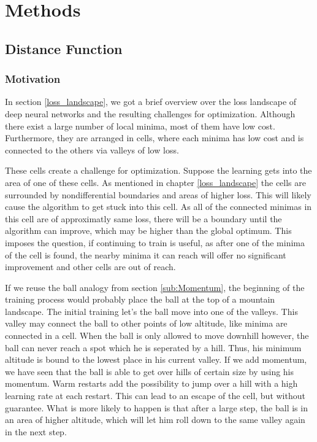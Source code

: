 \chapter{Methods}\label{cha:Methods}
\section{Distance Function}
\subsection{Motivation}\label{sub:Motivation}
In section \ref{loss_landscape}, we got a brief overview over the loss landscape
of deep neural networks and the resulting challenges for optimization. Although
there exist a large number of local minima, most of them have low cost.
Furthermore, they are arranged in cells, where each minima has low cost and is
connected to the others via valleys of low loss.

These cells create a challenge for optimization. Suppose the learning gets into
the area of one of these cells. As mentioned in chapter \ref{loss_landscape} the
cells are surrounded by nondifferential boundaries and areas of higher loss.
This will likely cause the algorithm to get stuck into this cell. As all of the
connected minimas in this cell are of approximatly same loss, there will be a
boundary until the algorithm can improve, which may be higher than the global
optimum. This imposes the question, if continuing to train is useful, as after
one of the minima of the cell is found, the nearby minima it can reach will
offer no significant improvement and other cells are out of reach.

If we reuse the ball analogy from section \ref{sub:Momentum}, the beginning of
the training process would probably place the ball at the top of a mountain
landscape. The initial training let's the ball move into one of the valleys.
This valley may connect the ball to other points of low altitude, like minima
are connected in a cell. When the ball is only allowed to move downhill however,
the ball can never reach a spot which he is seperated by a hill. Thus, his
minimum altitude is bound to the lowest place in his current valley. If we add
momentum, we have seen that the ball is able to get over hills of certain size
by using his momentum. Warm restarts add the possibility to jump over a hill
with a high learning rate at each restart. This can lead to an escape of the
cell, but without guarantee. What is more likely to happen is that after a large
step, the ball is in an area of higher altitude, which will let him roll down to
the same valley again in the next step.


